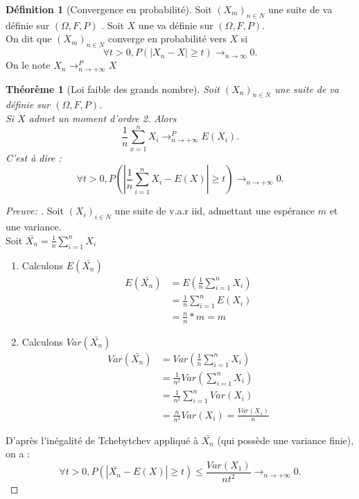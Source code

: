 \documentclass{article}
\theoremstyle{plain}%
\newtheorem{thm}{Théorème}[section]
\theoremstyle{definition}
\newtheorem{defn}{Définition}[section]
\theoremstyle{remark}
\begin{document}
\begin{defn}[Convergence en probabilité]
    Soit $ (X_m)_{n \in N} $ une suite de va définie sur $ (\Omega, F, P) $ . Soit $ X $ une va définie sur $ (\Omega, F, P) $.  \\
    On dit que $  (X_m)_{n \in N} $ converge en probabilité vers $ X $ si 
    \[
        \forall t > 0, P(\left| X_n - X \right| \geq t) \rightarrow_{n \rightarrow \infty } 0
    .\]
    On le note $ X_n \rightarrow_{n \rightarrow + \infty }^P X$ 
\end{defn}   

\begin{thm}[Loi faible des grands nombre]
    Soit $ (X_n)_{n \in N} $ une suite de va définie sur $ (\Omega, F, P) $. \\
    Si $ X $ admet un moment d'ordre 2. Alors 
    \[
        \frac{1}{n} \sum_{x=1}^{n} X_i \rightarrow_{n \rightarrow + \infty }^P E(X_i)
    .\]
    C'est à dire :
    \[
        \forall t > 0, P(\left| \frac{1}{n}\sum_{i=1}^{n}X_i -E(X) \right| \geq t) \rightarrow_{n \rightarrow + \infty } 0
    .\]
\end{thm}

\begin{proof}[Preuve: ]
    Soit $ (X_i)_{i \in N} $ une suite de v.a.r iid, admettant une espérance $ m $ et une variance. \\
    Soit $ \bar{X_n} = \frac{1}{n}\sum_{i=1}^{n}X_i $ 
    \begin{enumerate}
        \item Calculons $ E(\bar{X_n}) $ \begin{align*}
            E(\bar{X_n}) &= E(\frac{1}{n}\sum_{i=1}^{n}X_i) \\
                    &= \frac{1}{n}\sum_{i=1}^{n}E(X_i) \\
                    &= \frac{n}{n}*m = m 
        \end{align*} 
        \item Calculons $ Var(\bar{X_n}) $ \begin{align*}
            Var(\bar{X_n}) &= Var(\frac{1}{n}\sum_{i=1}^{n}X_i) \\
                        &= \frac{1}{n^2}Var(\sum_{i=1}^{n}X_i) \\
                        &= \frac{1}{n^2} \sum_{i=1}^{n} Var(X_i)\\
                        &= \frac{n}{n^2}Var(X_i) = \frac{Var(X_1)}{n}
        \end{align*} 
    \end{enumerate}
    D'après l'inégalité de Tchebytchev appliqué à $ \bar{X_n} $ (qui possède une variance finie), on a : 
    \[
        \forall t>0, P(\left| \bar{X_n}-E(X) \right| \geq t) \leq \frac{Var(X_1)}{nt^2} \longrightarrow _{n \to +\infty } 0
    .\]
\end{proof}
\end{document}
